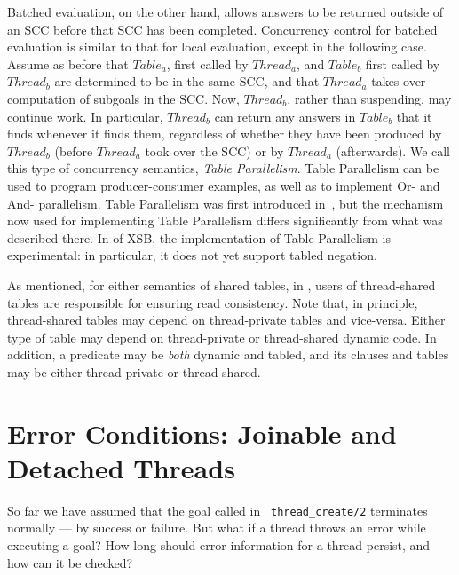 Batched evaluation, on the other hand, allows answers to be returned
outside of an SCC before that SCC has been completed.  Concurrency
control for batched evaluation is similar to that for local
evaluation, except in the following case.  Assume as before that
$Table_a$, first called by $Thread_a$, and $Table_b$ first called by
$Thread_b$ are determined to be in the same SCC, and that $Thread_a$
takes over computation of subgoals in the SCC.  Now, $Thread_b$,
rather than suspending, may continue work.  In particular, $Thread_b$
can return any answers in $Table_b$ that it finds whenever it finds
them, regardless of whether they have been produced by $Thread_b$
(before $Thread_a$ took over the SCC) or by $Thread_a$ (afterwards).
We call this type of concurrency semantics, {\em Table Parallelism}.
Table Parallelism can be used to program producer-consumer examples,
as well as to implement Or- and And- parallelism.  Table Parallelism
was first introduced in~\cite{FHSW95}, but the mechanism now used for
implementing Table Parallelism differs significantly from what was
described there.  In \version{} of XSB, the implementation of Table
Parallelism is experimental: in particular, it does not yet support
tabled negation.

As mentioned, for either semantics of shared tables, in \version{},
users of thread-shared tables are responsible for ensuring read
consistency.  Note that, in principle, thread-shared tables may depend
on thread-private tables and vice-versa.  Either type of table may
depend on thread-private or thread-shared dynamic code.  In addition,
a predicate may be {\em both} dynamic and tabled, and its clauses and
tables may be either thread-private or thread-shared.

\section{Error Conditions: Joinable and Detached Threads}

So far we have assumed that the goal called in {\tt
  thread\_create/2} terminates normally --- by success or
failure.  But what if a thread throws an error while executing a goal?
How long should error information for a thread persist, and how can it
be checked?


